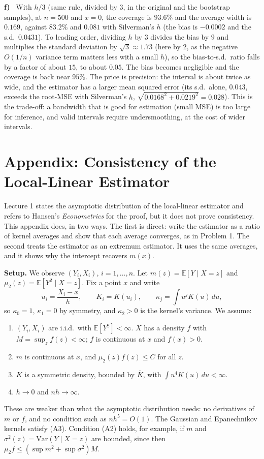 \documentclass[11pt]{article}
\newcommand{\E}{\mathbb{E}}
\newcommand{\Var}{\mathrm{Var}}
\theoremstyle{plain}
\newcommand{\itm}[1]{\par\textbf{#1)}\ }
\begin{document}
\itm{f}
With $h/3$ (same rule, divided by $3$, in the original and the bootstrap samples), at $n=500$ and $x=0$, the coverage is $93.6\%$ and the average width is $0.169$, against $83.2\%$ and $0.081$ with Silverman's $h$ (the bias is $-0.0002$ and the s.d.\ $0.0431$). To leading order, dividing $h$ by $3$ divides the bias by $9$ and multiplies the standard deviation by $\sqrt3\approx 1.73$ (here by $2$, as the negative $O(1/n)$ variance term matters less with a small $h$), so the bias-to-s.d.\ ratio falls by a factor of about $15$, to about $0.05$. The bias becomes negligible and the coverage is back near $95\%$. The price is precision: the interval is about twice as wide, and the estimator has a larger mean squared error (its s.d.\ alone, $0.043$, exceeds the root-MSE with Silverman's $h$, $\sqrt{0.0168^2+0.0219^2}=0.028$). This is the trade-off: a bandwidth that is good for estimation (small MSE) is too large for inference, and valid intervals require undersmoothing, at the cost of wider intervals.



\clearpage
\section*{Appendix: Consistency of the Local-Linear Estimator}

Lecture 1 states the asymptotic distribution of the local-linear estimator and refers to Hansen's \emph{Econometrics} for the proof, but it does not prove consistency. This appendix does, in two ways. The first is direct: write the estimator as a ratio of kernel averages and show that each average converges, as in Problem 1. The second treats the estimator as an extremum estimator. It uses the same averages, and it shows why the intercept recovers $m(x)$.

\textbf{Setup.} We observe $(Y_i,X_i)$, $i=1,\dots,n$. Let $m(z)=\E[Y\mid X=z]$ and $\mu_2(z)=\E[Y^2\mid X=z]$. Fix a point $x$ and write
\[
u_i = \frac{X_i-x}{h},\qquad K_i = K(u_i),\qquad \kappa_j = \int u^jK(u)\,du,
\]
so $\kappa_0=1$, $\kappa_1=0$ by symmetry, and $\kappa_2>0$ is the kernel's variance. We assume:
\begin{enumerate}[({A}1)]
	\item $(Y_i,X_i)$ are i.i.d.\ with $\E[Y^2]<\infty$. $X$ has a density $f$ with $M=\sup_zf(z)<\infty$; $f$ is continuous at $x$ and $f(x)>0$.
	\item $m$ is continuous at $x$, and $\mu_2(z)f(z)\le C$ for all $z$.
	\item $K$ is a symmetric density, bounded by $\bar K$, with $\int u^4K(u)\,du<\infty$.
	\item $h\to 0$ and $nh\to\infty$.
\end{enumerate}
These are weaker than what the asymptotic distribution needs: no derivatives of $m$ or $f$, and no condition such as $nh^5=O(1)$. The Gaussian and Epanechnikov kernels satisfy (A3). Condition (A2) holds, for example, if $m$ and $\sigma^2(z)=\Var(Y\mid X=z)$ are bounded, since then $\mu_2f\le(\sup m^2+\sup\sigma^2)M$.
\end{document}
